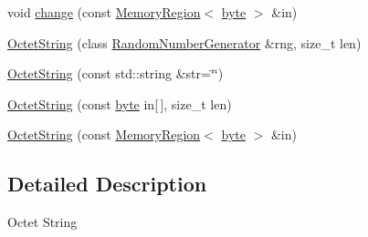 \begin{DoxyCompactItemize}
\item 
void \hyperlink{classBotan_1_1OctetString_a5c4335c43eb7618cec315f1af8155152}{change} (const \hyperlink{classBotan_1_1MemoryRegion}{Memory\-Region}$<$ \hyperlink{namespaceBotan_a7d793989d801281df48c6b19616b8b84}{byte} $>$ \&in)
\item 
\hyperlink{classBotan_1_1OctetString_a0ecab245e028c5ab2b5b76a9cb3d2481}{Octet\-String} (class \hyperlink{classBotan_1_1RandomNumberGenerator}{Random\-Number\-Generator} \&rng, size\-\_\-t len)
\item 
\hyperlink{classBotan_1_1OctetString_a29a6f6047cfe6051a9af6da7555336a6}{Octet\-String} (const std\-::string \&str=\char`\"{}\char`\"{})
\item 
\hyperlink{classBotan_1_1OctetString_a9857d33fd891d7284f42c42a00a523ce}{Octet\-String} (const \hyperlink{namespaceBotan_a7d793989d801281df48c6b19616b8b84}{byte} in\mbox{[}$\,$\mbox{]}, size\-\_\-t len)
\item 
\hyperlink{classBotan_1_1OctetString_ade9b11d6d47ea1f0f0fd11f3f6d295b2}{Octet\-String} (const \hyperlink{classBotan_1_1MemoryRegion}{Memory\-Region}$<$ \hyperlink{namespaceBotan_a7d793989d801281df48c6b19616b8b84}{byte} $>$ \&in)
\end{DoxyCompactItemize}


\subsection{Detailed Description}
Octet String 

